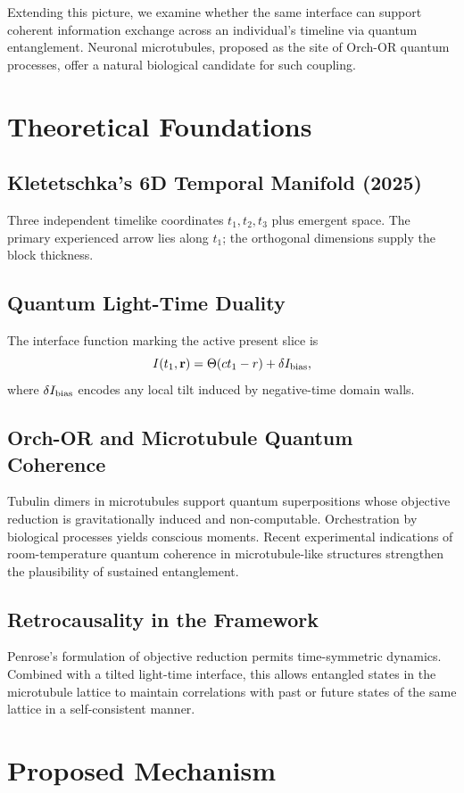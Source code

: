 \documentclass[11pt,a4paper]{article}
\begin{document}
Extending this picture, we examine whether the same interface can support coherent information exchange across an individual’s timeline via quantum entanglement. Neuronal microtubules, proposed as the site of Orch-OR quantum processes, offer a natural biological candidate for such coupling.

\section{Theoretical Foundations}

\subsection{Kletetschka’s 6D Temporal Manifold (2025)}
Three independent timelike coordinates $t_1, t_2, t_3$ plus emergent space. The primary experienced arrow lies along $t_1$; the orthogonal dimensions supply the block thickness.

\subsection{Quantum Light-Time Duality}
The interface function marking the active present slice is
\[
I(t_1, \mathbf{r}) = \Theta(c t_1 - r) + \delta I_{\rm bias},
\]
where $\delta I_{\rm bias}$ encodes any local tilt induced by negative-time domain walls.

\subsection{Orch-OR and Microtubule Quantum Coherence}
Tubulin dimers in microtubules support quantum superpositions whose objective reduction is gravitationally induced and non-computable. Orchestration by biological processes yields conscious moments. Recent experimental indications of room-temperature quantum coherence in microtubule-like structures strengthen the plausibility of sustained entanglement.

\subsection{Retrocausality in the Framework}
Penrose’s formulation of objective reduction permits time-symmetric dynamics. Combined with a tilted light-time interface, this allows entangled states in the microtubule lattice to maintain correlations with past or future states of the same lattice in a self-consistent manner.

\section{Proposed Mechanism}
\end{document}
